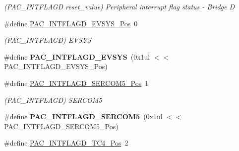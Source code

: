 \begin{DoxyCompactItemize}
\begin{DoxyCompactList}\small\item\em (P\+A\+C\+\_\+\+I\+N\+T\+F\+L\+A\+G\+D reset\+\_\+value) Peripheral interrupt flag status -\/ Bridge D \end{DoxyCompactList}\item 
\hypertarget{group___s_a_m_l21___p_a_c_ga3d310557630982a7f38db4a523d4f424}{}\#define \hyperlink{group___s_a_m_l21___p_a_c_ga3d310557630982a7f38db4a523d4f424}{P\+A\+C\+\_\+\+I\+N\+T\+F\+L\+A\+G\+D\+\_\+\+E\+V\+S\+Y\+S\+\_\+\+Pos}~0\label{group___s_a_m_l21___p_a_c_ga3d310557630982a7f38db4a523d4f424}

\begin{DoxyCompactList}\small\item\em (P\+A\+C\+\_\+\+I\+N\+T\+F\+L\+A\+G\+D) E\+V\+S\+Y\+S \end{DoxyCompactList}\item 
\hypertarget{group___s_a_m_l21___p_a_c_ga648e7abc607015be096d7906e1469a89}{}\#define {\bfseries P\+A\+C\+\_\+\+I\+N\+T\+F\+L\+A\+G\+D\+\_\+\+E\+V\+S\+Y\+S}~(0x1ul $<$$<$ P\+A\+C\+\_\+\+I\+N\+T\+F\+L\+A\+G\+D\+\_\+\+E\+V\+S\+Y\+S\+\_\+\+Pos)\label{group___s_a_m_l21___p_a_c_ga648e7abc607015be096d7906e1469a89}

\item 
\hypertarget{group___s_a_m_l21___p_a_c_ga859b551a7a65676a62c4964dd642024d}{}\#define \hyperlink{group___s_a_m_l21___p_a_c_ga859b551a7a65676a62c4964dd642024d}{P\+A\+C\+\_\+\+I\+N\+T\+F\+L\+A\+G\+D\+\_\+\+S\+E\+R\+C\+O\+M5\+\_\+\+Pos}~1\label{group___s_a_m_l21___p_a_c_ga859b551a7a65676a62c4964dd642024d}

\begin{DoxyCompactList}\small\item\em (P\+A\+C\+\_\+\+I\+N\+T\+F\+L\+A\+G\+D) S\+E\+R\+C\+O\+M5 \end{DoxyCompactList}\item 
\hypertarget{group___s_a_m_l21___p_a_c_ga36d0fe552d09b5fa4850c5b0929ffe77}{}\#define {\bfseries P\+A\+C\+\_\+\+I\+N\+T\+F\+L\+A\+G\+D\+\_\+\+S\+E\+R\+C\+O\+M5}~(0x1ul $<$$<$ P\+A\+C\+\_\+\+I\+N\+T\+F\+L\+A\+G\+D\+\_\+\+S\+E\+R\+C\+O\+M5\+\_\+\+Pos)\label{group___s_a_m_l21___p_a_c_ga36d0fe552d09b5fa4850c5b0929ffe77}

\item 
\hypertarget{group___s_a_m_l21___p_a_c_gac262283dd63cde7ffeb7b3ee04903697}{}\#define \hyperlink{group___s_a_m_l21___p_a_c_gac262283dd63cde7ffeb7b3ee04903697}{P\+A\+C\+\_\+\+I\+N\+T\+F\+L\+A\+G\+D\+\_\+\+T\+C4\+\_\+\+Pos}~2\label{group___s_a_m_l21___p_a_c_gac262283dd63cde7ffeb7b3ee04903697}


\end{DoxyCompactItemize}
